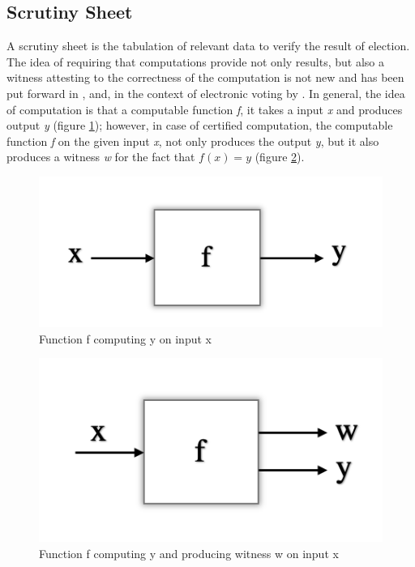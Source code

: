    \subsection{Scrutiny Sheet}
   \label{secback:scruntiny_sheet}
   A scrutiny sheet is the tabulation of relevant data to verify the result of election. 
   The idea of requiring that computations provide not only results, but also a witness attesting
    to the correctness of the computation is not new
	and has been put forward in \citep{89397}
	\citep{MCCONNELL2011119}
	\citep{Arkoudas:2005:DRC}, and, in the context of electronic voting by  \citep{Schurmann:2009:EET} \citep{Pattinson:2015:VCM}.
	 In general, the idea of computation is that a computable function \textit{f}, it takes 
	a input \textit{x} and produces output \textit{y} (figure \ref{fig:fnxy}); however, in case of
	 certified computation, 
	the computable function \textit{f} on the given input \textit{x}, not only produces the output \textit{y},
	but it also produces a witness \textit{w} for the fact that $ f (x) = y$ (figure \ref{fig:fnxyw}).
	
	\begin{figure}[!h]
	\centering
  \includegraphics[width=0.5\linewidth]{figs/function_fx.png}
  \caption{Function f computing y on input x}
  \label{fig:fnxy}
  \end{figure} 
  
  \begin{figure}[!h]
  \centering
  \includegraphics[width=0.5\linewidth]{figs/funcxy.png}
  \caption{Function f computing y and producing witness w on input x}
  \label{fig:fnxyw}
  \end{figure} 




